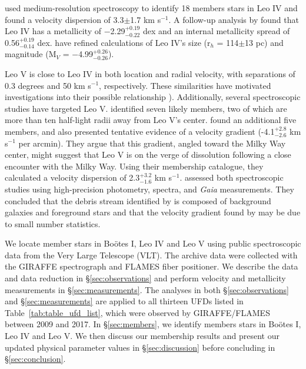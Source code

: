 \documentclass[twocolumn]{aastex63}
\begin{document}
\citet{sim2007} used medium-resolution spectroscopy to identify 18 members stars in Leo IV and found a velocity dispersion of 3.3$\pm$1.7 km s$^{-1}$. A follow-up analysis by \citet{kir2013} found that Leo IV has a metallicity of $-$2.29$^{+0.19}_{-0.22}$ dex and an internal metallicity spread of 0.56$^{+0.19}_{-0.14}$ dex. \citet{mun2018} have refined calculations of Leo IV's size (r$_h$ = 114$\pm$13 pc) and magnitude (M$_V$ = $-$4.99$^{+0.26}_{-0.26}$). 

Leo V is close to Leo IV in both location and radial velocity, with separations of 0.3 degrees and 50 km s$^{-1}$, respectively. These similarities have motivated investigations into their possible relationship \citep[e.g.,][]{dej2010, bla2012}). Additionally, several spectroscopic studies have targeted Leo V. \citet{wal2009} identified seven likely members, two of which are more than ten half-light radii away from Leo V's center. \citet{col2017} found an additional five members, and also presented tentative evidence of a velocity gradient (-4.1$^{+2.8}_{-2.6}$ km s$^{-1}$ per arcmin). They argue that this gradient, angled toward the Milky Way center, might suggest that Leo V is on the verge of dissolution following a close encounter with the Milky Way. Using their membership catalogue, they calculated a velocity dispersion of 2.3$^{+3.2}_{-1.6}$ km s$^{-1}$. \citet{mut2020} assessed both spectroscopic studies using high-precision photometry, spectra, and {\it Gaia} measurements. They concluded that the debris stream identified by \citet{san2012} is composed of background galaxies and foreground stars and that the velocity gradient found by \citet{col2017} may be due to small number statistics.

We locate member stars in Bo{\"o}tes I, Leo IV and Leo V using public spectroscopic data from the Very Large Telescope (VLT). The archive data were collected with the GIRAFFE spectrograph and FLAMES fiber positioner. We describe the data and data reduction in \S\ref{sec:observations} and perform velocity and metallicity measurements in \S\ref{sec:measurements}. The analyses in both \S\ref{sec:observations} and \S\ref{sec:measurements} are applied to all thirteen UFDs listed in Table~\ref{tab:table_ufd_list}, which were observed by GIRAFFE/FLAMES between 2009 and 2017. In \S\ref{sec:members}, we identify members stars in Bo{\"o}tes I, Leo IV and Leo V. We then discuss our membership results and present our updated physical parameter values in \S\ref{sec:discussion} before concluding in \S\ref{sec:conclusion}. 
\end{document}
